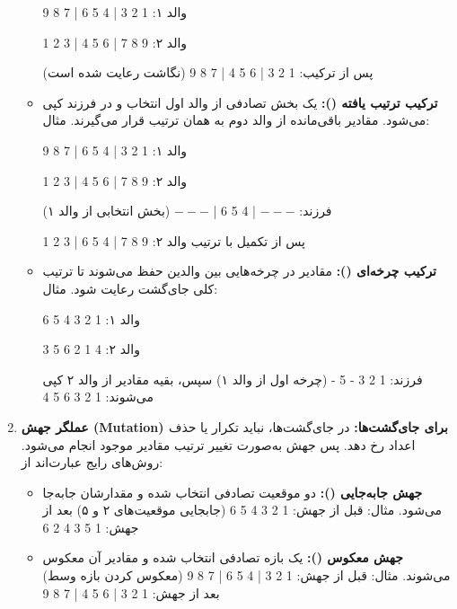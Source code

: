 \documentclass[12pt]{exam}
\begin{document}
\begin{questions}
\begin{parts}
\begin{enumerate}
\begin{itemize}
			والد ۱:           1 2 3 | 4 5 6 | 7 8 9
			
			
			والد ۲:           9 8 7 | 6 5 4 | 3 2 1
			
			
			پس از ترکیب: 1 2 3 | 6 5 4 | 7 8 9       (نگاشت رعایت شده است)
			
			
			\item \textbf{ترکیب ترتیب یافته ():}
			یک بخش تصادفی از والد اول انتخاب و در فرزند کپی می‌شود.
			مقادیر باقی‌مانده از والد دوم به همان ترتیب قرار می‌گیرند.
			مثال:
			
			والد ۱: 1 2 3 | 4 5 6 | 7 8 9
			
			والد ۲: 9 8 7 | 6 5 4 | 3 2 1
			
			فرزند: $---$ | 4 5 6 | $---$ (بخش انتخابی از والد ۱)
			
			پس از تکمیل با ترتیب والد ۲: 9 8 7 | 4 5 6 | 3 2 1
			
			
			\item \textbf{ترکیب چرخه‌ای ():}
			مقادیر در چرخه‌هایی بین والدین حفظ می‌شوند تا ترتیب کلی جای‌گشت رعایت شود.
			مثال:
			
			والد ۱: 1 2 3 4 5 6
			
			والد ۲: 4 1 2 6 5 3
			
			فرزند: 1 2 3 - 5 -  (چرخه اول از والد ۱)
			سپس، بقیه مقادیر از والد ۲ کپی می‌شوند: 1 2 3 6 5 4
			
			
		\end{itemize}
		\item \textbf{عملگر جهش (Mutation) برای جای‌گشت‌ها:}
		در جای‌گشت‌ها، نباید تکرار یا حذف اعداد رخ دهد. پس جهش به‌صورت تغییر ترتیب مقادیر موجود انجام می‌شود. روش‌های رایج عبارت‌اند از:
		
		\begin{itemize}
			\item \textbf{جهش جابه‌جایی ():}
			دو موقعیت تصادفی انتخاب شده و مقدارشان جابه‌جا می‌شود.
			\newline
			مثال:
			\newline
			قبل از جهش: 1 2 3 4 5 6   (جابجایی موقعیت‌های ۲ و ۵)
			\newline
	بعد از جهش: 1 5 3 4 2 6
			\item \textbf{جهش معکوس ():}
			یک بازه تصادفی انتخاب شده و مقادیر آن معکوس می‌شوند.
			مثال:
			\newline
			قبل از جهش: 1 2 3 | 4 5 6 | 7 8 9  (معکوس کردن بازه وسط)
			\newline
			بعد از جهش: 1 2 3 | 6 5 4 | 7 8 9
			

\end{itemize}
\end{enumerate}
\end{parts}
\end{questions}
\end{document}
